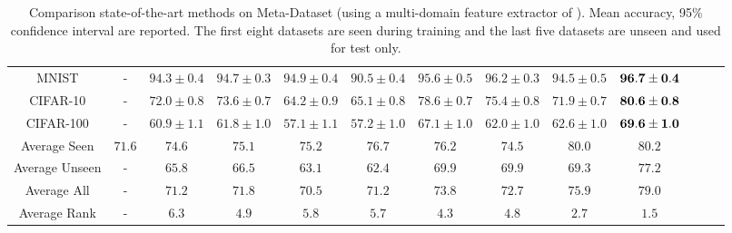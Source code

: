 \begin{table*}[h!]
{\begin{tabular}{ccccccccccccc}
			MNIST & - & $94.3 \pm 0.4$ & $94.7 \pm 0.3$ & $94.9 \pm 0.4$ & $90.5 \pm 0.4$ & $95.6 \pm 0.5$ & $96.2 \pm 0.3$ & $94.5 \pm 0.5$ & ${\bf 96.7 \pm 0.4}$ \\
			CIFAR-10 & - & $72.0 \pm 0.8$ & $73.6 \pm 0.7$ & $64.2 \pm 0.9$ & $65.1 \pm 0.8$ & $78.6 \pm 0.7$ & $75.4 \pm 0.8$ & $71.9 \pm 0.7$ & ${\bf 80.6 \pm 0.8}$ \\
			CIFAR-100 & - & $60.9 \pm 1.1$ & $61.8 \pm 1.0$ & $57.1 \pm 1.1$ & $57.2 \pm 1.0$ & $67.1 \pm 1.0$ & $62.0 \pm 1.0$ & $62.6 \pm 1.0$ & ${\bf 69.6 \pm 1.0}$ \\
			\midrule
			Average Seen & $71.6$ & $74.6$ & $75.1$ & $75.2$ & $76.7$ & $76.2$ & $74.5$ & $80.0$ & $80.2$ \\
			Average Unseen & - & $65.8$ & $66.5$ & $63.1$ & $62.4$ & $69.9$ & $69.9$ & $69.3$ & $77.2$ \\
			Average All & - & $71.2$ & $71.8$ & $70.5$ & $71.2$ & $73.8$ & $72.7$ & $75.9$ & $79.0$ \\
			\midrule
			Average Rank & - & $6.3$ & $4.9$ & $5.8$ & $5.7$ & $4.3$ & $4.8$ & $2.7$ & $1.5$ \\
			\bottomrule
		\end{tabular}%
			}
		\vspace{-0.35cm}
		\caption{Comparison state-of-the-art methods on Meta-Dataset (using a multi-domain feature extractor of \cite{li2021universal}). Mean accuracy, 95\% confidence interval are reported. The first eight datasets are seen during training and the last five datasets are unseen and used for test only.}
		\label{supptab:currmethod}
\end{table*}%

